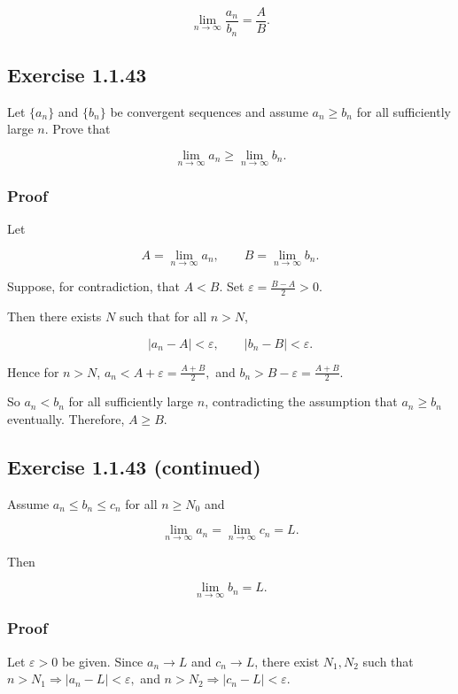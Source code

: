 \documentclass[11pt,a4paper]{article}
\begin{document}
\[
\lim_{n\to\infty}\frac{a_n}{b_n}=\frac{A}{B}.
\]

\subsection{Exercise 1.1.43}\label{exercise-1.1.43}

Let \(\{a_n\}\) and \(\{b_n\}\) be convergent sequences and assume
\(a_n\ge b_n\) for all sufficiently large \(n\). Prove that

\[
\lim_{n\to\infty}a_n\ge \lim_{n\to\infty}b_n.
\]

\subsubsection{Proof}\label{proof-3}

Let

\[
A=\lim_{n\to\infty}a_n,
\qquad B=\lim_{n\to\infty}b_n.
\]

Suppose, for contradiction, that \(A<B\). Set
\(\varepsilon=\frac{B-A}{2}>0.\)

Then there exists \(N\) such that for all \(n>N\),

\[
|a_n-A|<\varepsilon,
\qquad |b_n-B|<\varepsilon.
\]

Hence for \(n>N\), \(a_n<A+\varepsilon=\frac{A+B}{2},\) and
\(b_n>B-\varepsilon=\frac{A+B}{2}.\)

So \(a_n<b_n\) for all sufficiently large \(n\), contradicting the
assumption that \(a_n\ge b_n\) eventually. Therefore, \(A\ge B.\)

\subsection{Exercise 1.1.43
(continued)}\label{exercise-1.1.43-continued}

Assume \(a_n\le b_n\le c_n\) for all \(n\ge N_0\) and

\[
\lim_{n\to\infty}a_n = \lim_{n\to\infty}c_n = L.
\]

Then

\[
\lim_{n\to\infty}b_n = L.
\]

\subsubsection{Proof}\label{proof-4}

Let \(\varepsilon>0\) be given. Since \(a_n\to L\) and \(c_n\to L\),
there exist \(N_1,N_2\) such that
\(n>N_1 \Rightarrow |a_n-L|<\varepsilon,\) and
\(n>N_2 \Rightarrow |c_n-L|<\varepsilon.\)
\end{document}
